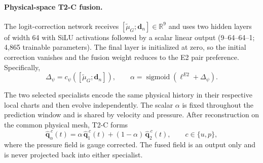 \paragraph{Physical-space T2-C fusion.}
The logit-correction network receives
$[\widetilde\mu_G;\bm d_n]\in\mathbb R^9$ and uses two hidden layers of width 64 with SiLU
activations followed by a scalar linear output (9--64--64--1; 4,865 trainable parameters).
The final layer is initialized at zero, so the initial correction vanishes
and the fusion weight reduces to the E2 pair preference.
Specifically,
\begin{equation}
  \Delta_\psi
  =
  c_\psi
  \left(
    [\widetilde\mu_G;\bm d_n]
  \right),
  \qquad
  \alpha
  =
  \operatorname{sigmoid}
  \left(
    \ell^{E2}+\Delta_\psi
  \right).
  \label{eq:app_t2c_gate}
\end{equation}

The two selected specialists encode the same physical history in their
respective local charts and then evolve independently.
The scalar $\alpha$ is fixed throughout the prediction window and is shared
by velocity and pressure.
After reconstruction on the common physical mesh, T2-C forms
\begin{equation}
  \widehat{\bm q}_{\alpha}^{\,c}(t)
  =
  \alpha\,
  \widehat{\bm q}_{1}^{\,c}(t)
  +
  (1-\alpha)\,
  \widehat{\bm q}_{2}^{\,c}(t),
  \qquad
  c\in\{u,p\},
  \label{eq:app_t2c_field_fusion}
\end{equation}
where the pressure field is gauge corrected.
The fused field is an output only and is never projected back into either
specialist.

